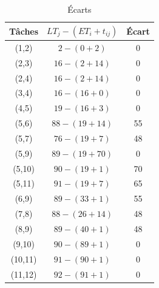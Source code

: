 \documentclass{article}
\begin{document}
\begin{table}[]
    \caption{Écarts} \label{tab:ecarts}
    \begin{center}
        \begin{tabular}{|c|c|c|}
           \hline
           Tâches & $LT_j-(ET_i+t_{ij})$ & Écart \\
           \hline 
           (1,2) & $2-(0+2)$ & 0 \\

           (2,3) & $16-(2+14)$ & 0 \\

           (2,4) & $16-(2+14)$ & 0 \\

           (3,4) & $16-(16+0)$ & 0 \\

           (4,5) & $19-(16+3)$ & 0 \\

           (5,6) & $88-(19+14)$ & 55 \\
           
           (5,7) & $76-(19+7)$ & 48 \\
           
           (5,9) & $89-(19+70)$ & 0 \\
           
           (5,10) & $90-(19+1)$ & 70 \\

           
           (5,11) & $91-(19+7)$ & 65 \\

           (6,9) & $89-(33+1)$ & 55 \\
           
           (7,8) & $88 - (26 + 14)$ & 48 \\
           
           (8,9) & $89-(40+1)$ & 48 \\
           
           (9,10) & $90-(89+1)$ & 0 \\
           
           (10,11) & $91 - (90 + 1)$ & 0 \\
           
           (11,12) & $92-(91+1)$ & 0 \\


            \hline
                                                     
                        
                                        
        \end{tabular}
    \end{center}
\end{table}
\end{document}
